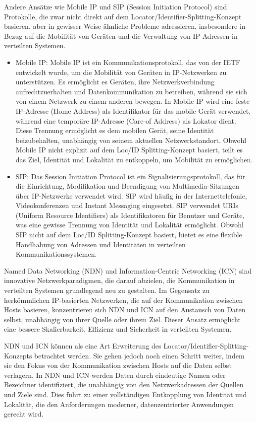 Andere Ansätze wie Mobile IP und SIP (Session Initiation Protocol) sind Protokolle, die zwar nicht direkt auf dem Locator/Identifier-Splitting-Konzept basieren, aber in gewisser Weise ähnliche Probleme adressieren, insbesondere in Bezug auf die Mobilität von Geräten und die Verwaltung von IP-Adressen in verteilten Systemen.
\begin{itemize}
\item Mobile IP: Mobile IP ist ein Kommunikationsprotokoll, das von der IETF entwickelt wurde, um die Mobilität von Geräten in IP-Netzwerken zu unterstützen. Es ermöglicht es Geräten, ihre Netzwerkverbindung aufrechtzuerhalten und Datenkommunikation zu betreiben, während sie sich von einem Netzwerk zu einem anderen bewegen. In Mobile IP wird eine feste IP-Adresse (Home Address) als Identifikator für das mobile Gerät verwendet, während eine temporäre IP-Adresse (Care-of Address) als Lokator dient. Diese Trennung ermöglicht es dem mobilen Gerät, seine Identität beizubehalten, unabhängig von seinem aktuellen Netzwerkstandort. Obwohl Mobile IP nicht explizit auf dem Loc/ID Splitting-Konzept basiert, teilt es das Ziel, Identität und Lokalität zu entkoppeln, um Mobilität zu ermöglichen. 

\item SIP: Das Session Initiation Protocol ist ein Signalisierungsprotokoll, das für die Einrichtung, Modifikation und Beendigung von Multimedia-Sitzungen über IP-Netzwerke verwendet wird. SIP wird häufig in der Internettelefonie, Videokonferenzen und Instant Messaging eingesetzt. SIP verwendet URIs (Uniform Resource Identifiers) als Identifikatoren für Benutzer und Geräte, was eine gewisse Trennung von Identität und Lokalität ermöglicht. Obwohl SIP nicht auf dem Loc/ID Splitting-Konzept basiert, bietet es eine flexible Handhabung von Adressen und Identitäten in verteilten Kommunikationssystemen.   
\end{itemize} 

Named Data Networking (NDN) und Information-Centric Networking (ICN) sind innovative Netzwerkparadigmen, die darauf abzielen, die Kommunikation in verteilten Systemen grundlegend neu zu gestalten. Im Gegensatz zu herkömmlichen IP-basierten Netzwerken, die auf der Kommunikation zwischen Hosts basieren, konzentrieren sich NDN und ICN auf den Austausch von Daten selbst, unabhängig von ihrer Quelle oder ihrem Ziel. Dieser Ansatz ermöglicht eine bessere Skalierbarkeit, Effizienz und Sicherheit in verteilten Systemen.

NDN und ICN können als eine Art Erweiterung des Locator/Identifier-Splitting-Konzepts betrachtet werden. Sie gehen jedoch noch einen Schritt weiter, indem sie den Fokus von der Kommunikation zwischen Hosts auf die Daten selbst verlagern. In NDN und ICN werden Daten durch eindeutige Namen oder Bezeichner identifiziert, die unabhängig von den Netzwerkadressen der Quellen und Ziele sind. Dies führt zu einer vollständigen Entkopplung von Identität und Lokalität, die den Anforderungen moderner, datenzentrierter Anwendungen gerecht wird.

